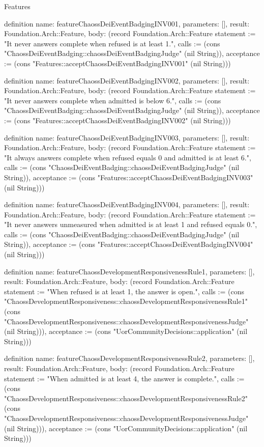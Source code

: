 \begin{lexlean}{Features}
\begin{semanticmodule}
definition{
  name: featureChaossDeiEventBadgingINV001,
  parameters: [],
  result: Foundation.Arch::Feature,
  body: (record Foundation.Arch::Feature {statement := "It never answers complete when refused is at least 1.", calls := (cons "ChaossDeiEventBadging::chaossDeiEventBadgingJudge" (nil String)), acceptance := (cons "Features::acceptChaossDeiEventBadgingINV001" (nil String))})
}

definition{
  name: featureChaossDeiEventBadgingINV002,
  parameters: [],
  result: Foundation.Arch::Feature,
  body: (record Foundation.Arch::Feature {statement := "It never answers complete when admitted is below 6.", calls := (cons "ChaossDeiEventBadging::chaossDeiEventBadgingJudge" (nil String)), acceptance := (cons "Features::acceptChaossDeiEventBadgingINV002" (nil String))})
}

definition{
  name: featureChaossDeiEventBadgingINV003,
  parameters: [],
  result: Foundation.Arch::Feature,
  body: (record Foundation.Arch::Feature {statement := "It always answers complete when refused equals 0 and admitted is at least 6.", calls := (cons "ChaossDeiEventBadging::chaossDeiEventBadgingJudge" (nil String)), acceptance := (cons "Features::acceptChaossDeiEventBadgingINV003" (nil String))})
}

definition{
  name: featureChaossDeiEventBadgingINV004,
  parameters: [],
  result: Foundation.Arch::Feature,
  body: (record Foundation.Arch::Feature {statement := "It never answers unmeasured when admitted is at least 1 and refused equals 0.", calls := (cons "ChaossDeiEventBadging::chaossDeiEventBadgingJudge" (nil String)), acceptance := (cons "Features::acceptChaossDeiEventBadgingINV004" (nil String))})
}

definition{
  name: featureChaossDevelopmentResponsivenessRule1,
  parameters: [],
  result: Foundation.Arch::Feature,
  body: (record Foundation.Arch::Feature {statement := "When refused is at least 1, the answer is open.", calls := (cons "ChaossDevelopmentResponsiveness::chaossDevelopmentResponsivenessRule1" (cons "ChaossDevelopmentResponsiveness::chaossDevelopmentResponsivenessJudge" (nil String))), acceptance := (cons "UorCommunityDecisions::application" (nil String))})
}

definition{
  name: featureChaossDevelopmentResponsivenessRule2,
  parameters: [],
  result: Foundation.Arch::Feature,
  body: (record Foundation.Arch::Feature {statement := "When admitted is at least 4, the answer is complete.", calls := (cons "ChaossDevelopmentResponsiveness::chaossDevelopmentResponsivenessRule2" (cons "ChaossDevelopmentResponsiveness::chaossDevelopmentResponsivenessJudge" (nil String))), acceptance := (cons "UorCommunityDecisions::application" (nil String))})
}


\end{semanticmodule}
\end{lexlean}
